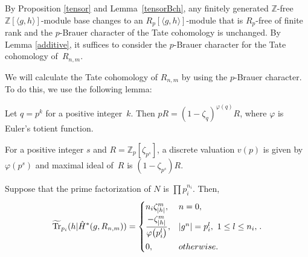 By Proposition \ref{tensor} and Lemma~\ref{tensorBch}, any finitely generated $\mathbb{Z}$-free $\mathbb{Z}[\langle g,h \rangle]$-module base changes to an $R_p[\langle g,h \rangle]$-module that is $R_p$-free of finite rank and the $p$-Brauer character of the Tate cohomology is unchanged.
By Lemma \ref{additive}, it suffices to consider the $p$-Brauer character for the Tate cohomology of~$R_{n,m}$.

We will calculate the Tate cohomology of $R_{n,m}$ by using the $p$-Brauer character. To do this, we use the following lemma:

\begin{Lemma} \label{pR}
 Let $q=p^k$ for a positive integer~$k$. Then $pR=(1-\zeta_q)^{\varphi(q)}R$, where $\varphi$ is Euler's totient function.
\end{Lemma}

For a positive integer $s$ and $R=\mathbb{Z}_{p}[\zeta_{p^s}]$, a discrete valuation $v(p)$ is given by $\varphi(p^s)$ and maximal ideal of~$R$ is $(1-\zeta_{p^s})R$.

\begin{Lemma}\label{Bch}
Suppose that the prime factorization of $N$ is $\prod p_i^{n_i}$.
Then,
\[
\widetilde{\operatorname{Tr}}_{p_i}(h|\hat{H}^*(g,R_{n,m}))= \begin{cases}
n_i\zeta_{|h|}^m, & n=0, \vspace{1mm}\\
\dfrac{-\zeta_{|h|}^m}{\varphi \big(p_i^l\big)}, & |g^n|=p_i^l, \ 1\leq l\leq n_i, \vspace{1mm}\\
0, & otherwise.
\end{cases}.
\]
\end{Lemma}

